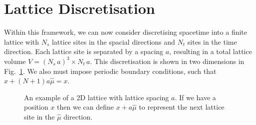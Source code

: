 \section{Lattice Discretisation}
Within this framework, we can now consider discretising spacetime into a finite lattice with $N_s$ lattice sites in the spacial directions and $N_t$ sites in the time direction. Each lattice site is separated by a spacing $a$, resulting in a total lattice volume $V=(N_s\,a)^3\times N_t\,a$. This discretisation is shown in two dimensions in Fig.~\ref{fig:LatticeExample}. We also must impose periodic boundary conditions, such that $x+(N+1)a\hat{\mu}=x$.\\
%
\begin{figure}[h]
\centering
{}
\caption{\label{fig:LatticeExample}An example of a 2D lattice with lattice spacing $a$. If we have a position $x$ then we can define $x+a\hat{\mu}$ to represent the next lattice site in the $\hat{\mu}$ direction.}
\end{figure}
%

